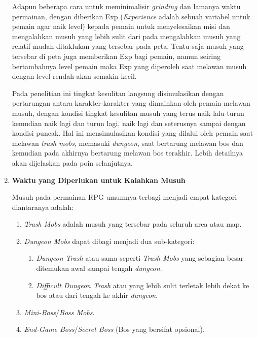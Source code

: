 \begin{subs}
\begin{enumerate}[label=\textbf{\arabic*).}]
		Adapun beberapa cara untuk meminimalisir \textit{grinding} dan lamanya waktu permainan, dengan diberikan Exp (\textit{Experience} adalah sebuah variabel untuk pemain agar naik level) kepada pemain untuk menyelesaikan misi dan mengalahkan musuh yang lebih sulit dari pada mengalahkan musuh yang relatif mudah ditaklukan yang tersebar pada peta. Tentu saja musuh yang tersebar di peta juga memberikan Exp bagi pemain, namun seiring bertambahnya level pemain maka Exp yang diperoleh saat melawan musuh dengan level rendah akan semakin kecil.
		\vspace{1ex}
		
		Pada penelitian ini tingkat kesulitan langsung disimulasikan dengan pertarungan antara karakter-karakter yang dimainkan oleh pemain melawan musuh, dengan kondisi tingkat kesulitan musuh yang terus naik lalu turun kemudian naik lagi dan turun lagi, naik lagi dan seterusnya sampai dengan kondisi puncak. Hal ini mensimulasikan kondisi yang dilalui oleh pemain saat melawan \textit{trash mobs}, memasuki \textit{dungeon}, saat bertarung melawan bos dan kemudian pada akhirnya bertarung melawan bos terakhir. Lebih detailnya akan dijelaskan pada poin selanjutnya.
		\vspace{1ex}
	
		\item \textbf{Waktu yang Diperlukan untuk Kalahkan Musuh}
	
		Musuh pada permainan RPG umumnya terbagi menjadi empat kategori diantaranya adalah:
		
		\begin{enumerate}[label=\Alph*).]
			\item \textit{Trash Mobs} adalah musuh yang tersebar pada seluruh area atau map.
			\item \textit{Dungeon Mobs} dapat dibagi menjadi dua sub-kategori:
			\begin{enumerate}[label=\alph*).]
				\item \textit{Dungeon Trash} atau sama seperti \textit{Trash Mobs} yang sebagian besar ditemukan awal sampai tengah \textit{dungeon}.
				\item \textit{Difficult Dungeon Trash} atau yang lebih sulit terletak lebih dekat ke bos atau dari tengah ke akhir \textit{dungeon}.
			\end{enumerate}
			\item \textit{Mini-Boss}/\textit{Boss Mobs}.
			\item \textit{End-Game Boss}/\textit{Secret Boss} (Bos yang bersifat opsional).
		\end{enumerate}
		

\end{enumerate}
\end{subs}
